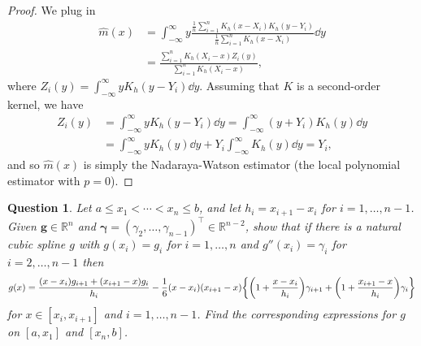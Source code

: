 \documentclass{article}
\theoremstyle{plain}
\newtheorem{question}{Question}
\theoremstyle{remark}
\renewcommand{\vec}{\boldsymbol}
\newcommand{\Bb}{\mathbb}
\newcommand{\RR}{\Bb R}
\newcommand{\T}{^\top} %
\begin{document}
\begin{proof}
	We plug in 
	\begin{align*}
	\hat m(x) &= \int_{-\infty}^\infty y \frac{\frac1n \sum_{i=1}^n K_h(x - X_i) K_h( y - Y_i)}{\frac1n \sum_{i=1}^n K_h(x - X_i)} \dd{y} \\
	&= \frac{ \sum_{i=1}^n K_h(X_i - x) Z_i(y)}{\sum_{i=1}^n K_h(X_i - x)},
	\end{align*}
where $Z_i(y) = \int_{-\infty}^\infty y K_h(y - Y_i) \dd{y}$. Assuming that $K$ is a second-order kernel, we have
\begin{align*}
Z_i(y) &= \int_{-\infty}^\infty y K_h(y - Y_i) \dd{y} = \int_{-\infty}^\infty (y + Y_i) K_h(y) \dd{y} \\
&= \int_{-\infty}^\infty y K_h(y) \dd{y} + Y_i \int_{-\infty}^\infty K_h(y)\dd{y} = Y_i, 
\end{align*}
and so $\hat m(x)$ is simply the Nadaraya-Watson estimator (the local polynomial estimator with $p = 0$). 
\end{proof}

\begin{question}
	Let $a \leq x_1 < \dotsb < x_n \leq b$, and let $h_i = x_{i+1} - x_i$ for $i = 1, \dotsc, n-1$. Given $\vec g \in \RR^n$ and $\vec \gamma = (\gamma_2, \dotsc, \gamma_{n-1})\T \in \RR^{n-2}$, show that if there is a natural cubic spline $g$ with $g(x_i) = g_i$ for $i =1 , \dotsc, n$ and $g''(x_i) = \gamma_i$ for $i = 2, \dotsc, n-1$ then
	\[
	g(x) = \frac{(x - x_i) g_{i+1} + (x_{i+1} - x)g_i}{h_i} - \frac16(x-x_i)(x_{i+1}-x)\qty{\qty(1 + \frac{x - x_i}{h_i}) \gamma_{i+1} + \qty(1 + \frac{x_{i+1} - x}{h_i})\gamma_i}
	\]
	for $x \in [x_i, x_{i+1}]$ and $i = 1, \dotsc, n-1$. Find the corresponding expressions for $g$ on $[a, x_1]$ and $[x_n, b]$. 
\end{question}
\end{document}
